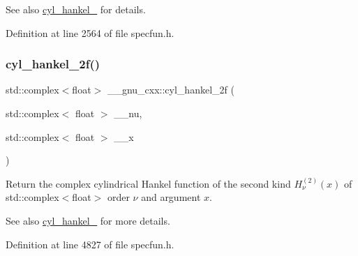 \begin{DoxySeeAlso}{See also}
\hyperlink{group__gnu__math__spec__func_ga7ebc71dd48ac97255d72f5f5f43dfd8e}{cyl\+\_\+hankel\+\_} for details. 
\end{DoxySeeAlso}


Definition at line 2564 of file specfun.\+h.

\mbox{\label{group__gnu__math__spec__func_gae21f9d09b937eaf9729982da5a382f20}} 
\subsubsection{\texorpdfstring{cyl\+\_\+hankel\+\_\+2f()}{cyl\_hankel\_2f()}\hspace{0.1cm}{\footnotesize\ttfamily [2/2]}}
{\footnotesize\ttfamily std\+::complex$<$float$>$ \+\_\+\+\_\+gnu\+\_\+cxx\+::cyl\+\_\+hankel\+\_\+2f (\begin{DoxyParamCaption}\item[{std\+::complex$<$ float $>$}]{\+\_\+\+\_\+nu,  }\item[{std\+::complex$<$ float $>$}]{\+\_\+\+\_\+x }\end{DoxyParamCaption})\hspace{0.3cm}{\ttfamily [inline]}}

Return the complex cylindrical Hankel function of the second kind $ H^{(2)}_\nu(x) $ of {\ttfamily std\+::complex$<$float$>$} order $ \nu $ and argument $ x $.

\begin{DoxySeeAlso}{See also}
\hyperlink{group__gnu__math__spec__func_ga7ebc71dd48ac97255d72f5f5f43dfd8e}{cyl\+\_\+hankel\+\_} for more details. 
\end{DoxySeeAlso}


Definition at line 4827 of file specfun.\+h.

\mbox{\label{group__gnu__math__spec__func_ga4babb91ca6906f237e8bd1f0f1a10509}} 
